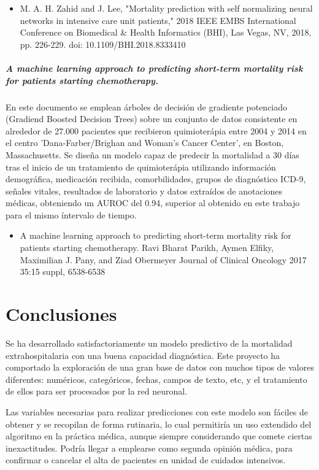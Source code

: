 \documentclass{report}
\begin{document}
\begin{itemize}
\item M. A. H. Zahid and J. Lee, "Mortality prediction with self normalizing neural networks in intensive care unit patients," 2018 IEEE EMBS International Conference on Biomedical \& Health Informatics (BHI), Las Vegas, NV, 2018, pp. 226-229.
doi: 10.1109/BHI.2018.8333410
\end{itemize}

\paragraph{A machine learning approach to predicting short-term mortality risk for patients starting chemotherapy.}

En este documento se emplean árboles de decisión de gradiente potenciado (Gradiend Boosted Decision Trees) sobre un conjunto de datos consistente en alrededor de 27.000 pacientes que recibieron quimioterápia entre 2004 y 2014 en el centro 'Dana-Farber/Brighan and Woman's Cancer Center', en Boston, Massachusetts. Se diseña un modelo capaz de predecir la mortalidad a 30 días tras el inicio de un tratamiento de quimioterápia utilizando información demográfica, medicación recibida, comorbilidades, grupos de diagnóstico ICD-9, señales vitales, resultados de laboratorio y datos extraídos de anotaciones médicas, obteniendo un AUROC del 0.94, superior al obtenido en este trabajo para el mismo íntervalo de tiempo.

\begin{itemize}
\item A machine learning approach to predicting short-term mortality risk for patients starting chemotherapy.
Ravi Bharat Parikh, Aymen Elfiky, Maximilian J. Pany, and Ziad Obermeyer
Journal of Clinical Oncology 2017 35:15 suppl, 6538-6538 
\end{itemize}

\chapter*{Conclusiones}

Se ha desarrollado satisfactoriamente un modelo predictivo de la
mortalidad extrahospitalaria con una buena capacidad diagnóstica.
Este proyecto ha comportado la exploración de una gran base de datos con
muchos tipos de valores diferentes: numéricos, categóricos, fechas,
campos de texto, etc, y el tratamiento de ellos para ser procesados por
la red neuronal.

Las variables necesarias para realizar predicciones con este modelo son
fáciles de obtener y se recopilan de forma rutinaria, lo cual permitiría
un uso extendido del algoritmo en la práctica médica, aunque siempre
considerando que comete ciertas inexactitudes. Podría llegar a emplearse
como segunda opinión médica, para confirmar o cancelar el alta de
pacientes en unidad de cuidados intensivos.
\end{document}
